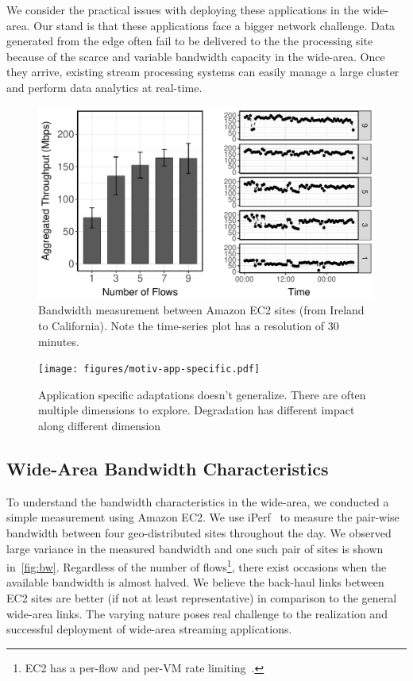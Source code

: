 \vspace{0.5em}

We consider the practical issues with deploying these applications in the
wide-area. Our stand is that these applications face a bigger network challenge.
Data generated from the edge often fail to be delivered to the the processing
site because of the scarce and variable bandwidth capacity in the
wide-area. Once they arrive, existing stream processing systems can easily
manage a large cluster and perform data analytics at real-time.

\begin{figure}
  \centering
  \includegraphics[width=.95\linewidth]{figures/motiv-aws.pdf}
  \caption{Bandwidth measurement between Amazon EC2 sites (from Ireland to
    California). Note the time-series plot has a resolution of 30 minutes.}
  \label{fig:bw}
\end{figure}

\begin{figure}
  \centering
  \texttt{[image: figures/motiv-app-specific.pdf]}
  \caption{Application specific adaptations doesn't generalize. There are often
    multiple dimensions to explore. Degradation has different impact along
    different dimension}
  \label{fig:app-specific}
\end{figure}

\subsection{Wide-Area Bandwidth Characteristics}
\label{sec:wide-area-bandwidth}

To understand the bandwidth characteristics in the wide-area, we conducted a
simple measurement using Amazon EC2. We use iPerf~\cite{iperf3} to measure the
pair-wise bandwidth between four geo-distributed sites throughout the day. We
observed large variance in the measured bandwidth and one such pair of sites is
shown in~\autoref{fig:bw}. Regardless of the number of flows\footnote{EC2 has a
  per-flow and per-VM rate limiting~\cite{zhang2016guaranteeing}.}, there exist
occasions when the available bandwidth is almost halved. We believe the
back-haul links between EC2 sites are better (if not at least representative) in
comparison to the general wide-area links. The varying nature poses real
challenge to the realization and successful deployment of wide-area streaming
applications.

